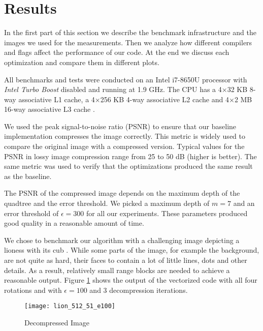 \section{Results}\label{sec:exp}

In the first part of this section we describe the benchmark infrastructure and the
images we used for the measurements. Then we analyze how different compilers and flags  
affect the performance of our code. At the end we discuss each optimization and compare
them in different plots.

 All benchmarks and tests were conducted on an Intel
i7-8650U processor with \textit{Intel Turbo Boost} disabled and running at 1.9
GHz. The CPU has a 4$\times$32 KB 8-way associative L1 cache, a 4$\times$256 KB
4-way associative L2 cache and 4$\times$2 MB 16-way associative L3 cache
\cite{intel-opt-manual}. 

We used the peak signal-to-noise ratio (PSNR) to ensure that our baseline implementation
compresses the image correctly. This metric is widely used to compare the original image with
a compressed version. Typical values for the PSNR in lossy image compression range from 25 to 
50 dB (higher is better). The same metric was used to verify that the optimizations 
produced the same result as the baseline.

The PSNR of the compressed image depends on the maximum depth of the quadtree and the error
threshold. We picked a maximum depth of $m=7$ and an error threshold of $\epsilon=300$ for
all our experiments. These parameters produced good quality in a reasonable amount of time.


We chose to benchmark our algorithm with a challenging image depicting a lioness
with its cub \cite{lions}. While some parts of the image, for example the
background, are not quite as hard, their faces to contain a lot of little lines,
dots and other details. As a result, relatively small range blocks are needed to
achieve a reasonable output. Figure \ref{fig:lions} shows the output of the
vectorized code with all four rotations and with $\epsilon=100$ and 3
decompression iterations.

\begin{figure}[H]
  \centering
  \texttt{[image: lion\_512\_51\_e100]}
  \caption{Decompressed Image}
  \label{fig:lions}
\end{figure}

